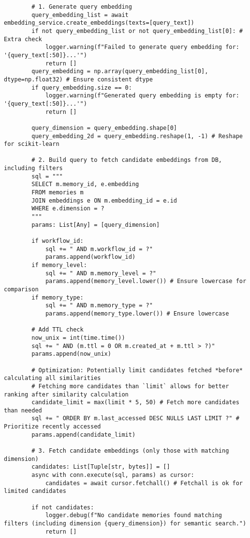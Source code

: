 \documentclass[12pt,a4paper]{article}
\begin{document}
\begin{pageablecode}
\begin{verbatim}
        # 1. Generate query embedding
        query_embedding_list = await embedding_service.create_embeddings(texts=[query_text])
        if not query_embedding_list or not query_embedding_list[0]: # Extra check
            logger.warning(f"Failed to generate query embedding for: '{query_text[:50]}...'")
            return []
        query_embedding = np.array(query_embedding_list[0], dtype=np.float32) # Ensure consistent dtype
        if query_embedding.size == 0:
            logger.warning(f"Generated query embedding is empty for: '{query_text[:50]}...'")
            return []

        query_dimension = query_embedding.shape[0]
        query_embedding_2d = query_embedding.reshape(1, -1) # Reshape for scikit-learn

        # 2. Build query to fetch candidate embeddings from DB, including filters
        sql = """
        SELECT m.memory_id, e.embedding
        FROM memories m
        JOIN embeddings e ON m.embedding_id = e.id
        WHERE e.dimension = ?
        """ 
        params: List[Any] = [query_dimension]

        if workflow_id:
            sql += " AND m.workflow_id = ?"
            params.append(workflow_id)
        if memory_level:
            sql += " AND m.memory_level = ?"
            params.append(memory_level.lower()) # Ensure lowercase for comparison
        if memory_type:
            sql += " AND m.memory_type = ?"
            params.append(memory_type.lower()) # Ensure lowercase

        # Add TTL check
        now_unix = int(time.time())
        sql += " AND (m.ttl = 0 OR m.created_at + m.ttl > ?)"
        params.append(now_unix)

        # Optimization: Potentially limit candidates fetched *before* calculating all similarities
        # Fetching more candidates than `limit` allows for better ranking after similarity calculation
        candidate_limit = max(limit * 5, 50) # Fetch more candidates than needed
        sql += " ORDER BY m.last_accessed DESC NULLS LAST LIMIT ?" # Prioritize recently accessed
        params.append(candidate_limit)

        # 3. Fetch candidate embeddings (only those with matching dimension)
        candidates: List[Tuple[str, bytes]] = []
        async with conn.execute(sql, params) as cursor:
            candidates = await cursor.fetchall() # Fetchall is ok for limited candidates

        if not candidates:
            logger.debug(f"No candidate memories found matching filters (including dimension {query_dimension}) for semantic search.")
            return []


\end{verbatim}
\end{pageablecode}
\end{document}
